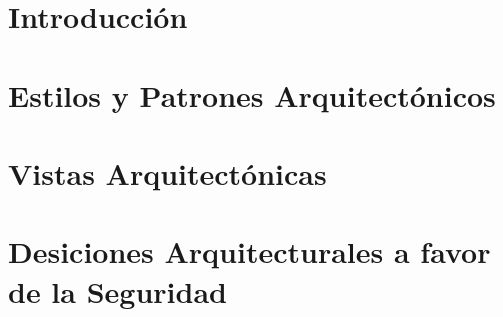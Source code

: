 \renewcommand{\contentsname}{Contenido}
\tableofcontents
\newpage

\section{Introducción}
\label{sec:intro}


\section{Estilos y Patrones Arquitectónicos}
\label{sec:epa}


\section{Vistas Arquitectónicas}\label{sec:va}


\section{Desiciones Arquitecturales a favor de la Seguridad}\label{sec:va}

